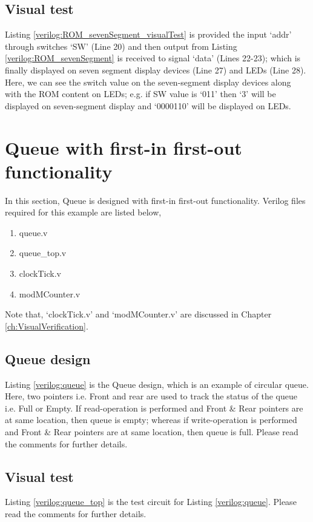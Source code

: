 \subsection{Visual test}
Listing \ref{verilog:ROM_sevenSegment_visualTest} is provided the input `addr' through switches `SW' (Line 20) and then output from Listing \ref{verilog:ROM_sevenSegment} is received to signal `data' (Lines 22-23); which is finally displayed on seven segment display devices (Line 27) and LEDs (Line 28). Here, we can see the switch value on the seven-segment display devices along with the ROM content on LEDs; e.g. if SW value is `011' then `3' will be displayed on seven-segment display and `0000110' will be displayed on LEDs. 


\section{Queue with first-in first-out functionality}
In this section, Queue is designed with first-in first-out functionality. Verilog files required for this example are listed below, 
\begin{enumerate}
	\item queue.v
	\item queue\_top.v
	\item clockTick.v
	\item modMCounter.v
\end{enumerate}
Note that, `clockTick.v' and `modMCounter.v' are discussed in Chapter \ref{ch:VisualVerification}.

\subsection{Queue design}
Listing \ref{verilog:queue} is the Queue design, which is an example of circular queue. Here, two pointers i.e. Front and rear are used to track the status of the queue i.e. Full or Empty. If read-operation is performed and Front \& Rear pointers are at same location, then queue is empty; whereas if write-operation is performed and Front \& Rear pointers are at same location, then queue is full. Please read the comments for further details.


\subsection{Visual test}
Listing \ref{verilog:queue_top} is the test circuit for Listing \ref{verilog:queue}. Please read the comments for further details.

%
